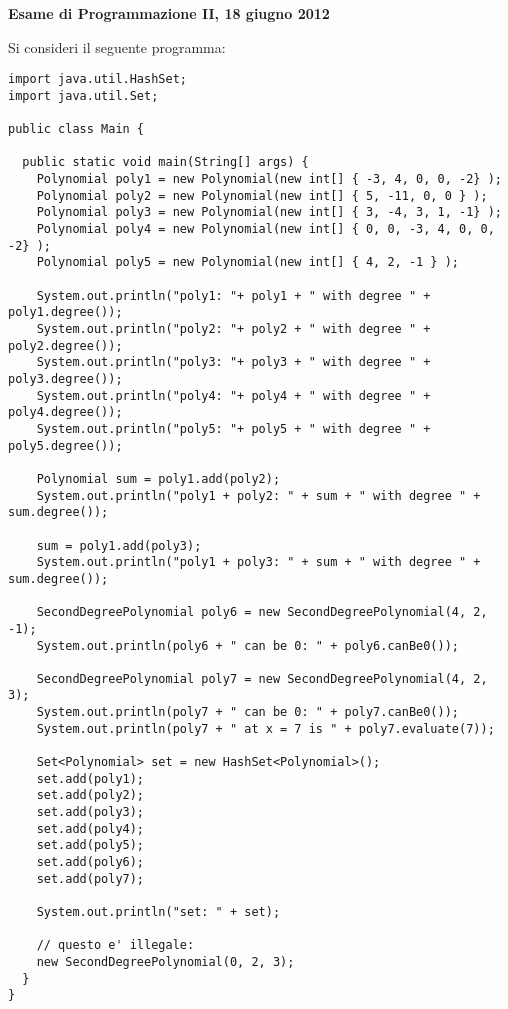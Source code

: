 \documentclass{article}[10pt]
\begin{document}
\begin{center} {\bf Esame di Programmazione II, 18 giugno 2012}\end{center}

Si consideri il seguente programma:
%
{\small
\begin{verbatim}
import java.util.HashSet;
import java.util.Set;

public class Main {

  public static void main(String[] args) {
    Polynomial poly1 = new Polynomial(new int[] { -3, 4, 0, 0, -2} );
    Polynomial poly2 = new Polynomial(new int[] { 5, -11, 0, 0 } );
    Polynomial poly3 = new Polynomial(new int[] { 3, -4, 3, 1, -1} );
    Polynomial poly4 = new Polynomial(new int[] { 0, 0, -3, 4, 0, 0, -2} );
    Polynomial poly5 = new Polynomial(new int[] { 4, 2, -1 } );

    System.out.println("poly1: "+ poly1 + " with degree " + poly1.degree());
    System.out.println("poly2: "+ poly2 + " with degree " + poly2.degree());
    System.out.println("poly3: "+ poly3 + " with degree " + poly3.degree());
    System.out.println("poly4: "+ poly4 + " with degree " + poly4.degree());
    System.out.println("poly5: "+ poly5 + " with degree " + poly5.degree());

    Polynomial sum = poly1.add(poly2);
    System.out.println("poly1 + poly2: " + sum + " with degree " + sum.degree());

    sum = poly1.add(poly3);
    System.out.println("poly1 + poly3: " + sum + " with degree " + sum.degree());

    SecondDegreePolynomial poly6 = new SecondDegreePolynomial(4, 2, -1);
    System.out.println(poly6 + " can be 0: " + poly6.canBe0());

    SecondDegreePolynomial poly7 = new SecondDegreePolynomial(4, 2, 3);
    System.out.println(poly7 + " can be 0: " + poly7.canBe0());
    System.out.println(poly7 + " at x = 7 is " + poly7.evaluate(7));

    Set<Polynomial> set = new HashSet<Polynomial>();
    set.add(poly1);
    set.add(poly2);
    set.add(poly3);
    set.add(poly4);
    set.add(poly5);
    set.add(poly6);
    set.add(poly7);

    System.out.println("set: " + set);

    // questo e' illegale:
    new SecondDegreePolynomial(0, 2, 3);
  }
}
\end{verbatim}
}
\end{document}
